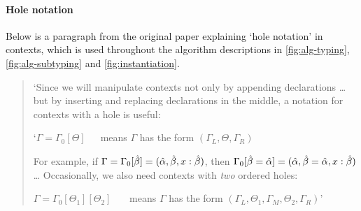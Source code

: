 \paragraph{Hole notation}
Below is a paragraph from the original paper \cite{completebidir} explaining `hole notation' in contexts, which is used throughout the algorithm descriptions in \ref{fig:alg-typing}, \ref{fig:alg-subtyping} and \ref{fig:instantiation}. 
\begin{quote}
`Since we will manipulate contexts not only by appending declarations \dots but by inserting and replacing declarations in the middle, a notation for contexts with a hole is useful:
\vspace{-4pt}
\begin{displ}
  `$\Gamma = \Gamma_0[\Theta]$~~~means $\Gamma$ has the form $(\Gamma_L, \Theta, \Gamma_R)$
\end{displ}
For example, if $\Gamma = \Gamma_0[\hat{\beta}] = (\hat{\alpha}, \hat{\beta}, x : \hat{\beta})$,
then $\Gamma_0[{\hat{\beta}} = {\hat{\alpha}}] = (\hat{\alpha}, {\hat{\beta}} = {\hat{\alpha}}, x : \hat{\beta})$
\newline\dots\newline
Occasionally, we also need contexts with \emph{two} ordered holes:
\begin{displ}
  $\Gamma = \Gamma_0[\Theta_1][\Theta_2]$
  ~~~means
  $\Gamma$ has the form $(\Gamma_L, \Theta_1, \Gamma_M, \Theta_2, \Gamma_R)$' \cite{completebidir}
\end{displ}
\end{quote}


